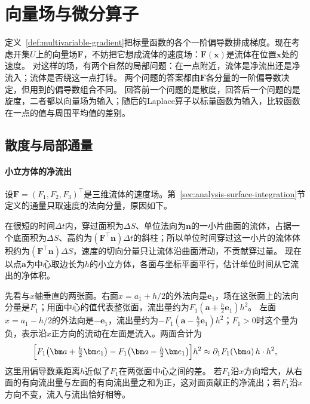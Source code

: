 \section{向量场与微分算子}

定义~\ref{def:multivariable-gradient}把标量函数的各个一阶偏导数排成梯度。现在考虑开集$U$上的向量场$\bm F$，不妨把它想成流体的速度场：$\bm F(\bm x)$是流体在位置$\bm x$处的速度。
对这样的场，有两个自然的局部问题：在一点附近，流体是净流出还是净流入；流体是否绕这一点打转。
两个问题的答案都由$\bm F$各分量的一阶偏导数决定，但用到的偏导数组合不同。
回答前一个问题的是散度，回答后一个问题的是旋度，二者都以向量场为输入；随后的Laplace算子以标量函数为输入，比较函数在一点的值与周围平均值的差别。

\subsection{散度与局部通量}

\paragraph{小立方体的净流出}

设$\bm F=(F_1,F_2,F_3)^\top$是三维流体的速度场。第~\ref{sec:analysis-surface-integration}节定义的通量只取速度的法向分量，原因如下。

在很短的时间$\Delta t$内，穿过面积为$\Delta S$、单位法向为$\bm n$的一小片曲面的流体，占据一个底面积为$\Delta S$、高约为$(\bm F^\top\bm n)\Delta t$的斜柱；所以单位时间穿过这一小片的流体体积约为$(\bm F^\top\bm n)\Delta S$，速度的切向分量只让流体沿曲面滑动，不贡献穿过量。
现在以点$\bm a$为中心取边长为$h$的小立方体，各面与坐标平面平行，估计单位时间从它流出的净体积。

先看与$x$轴垂直的两张面。右面$x=a_1+h/2$的外法向是$\bm e_1$，场在这张面上的法向分量是$F_1$；用面中心的值代表整张面，流出量约为$F_1(\bm a+\tfrac h2\bm e_1)h^2$。
左面$x=a_1-h/2$的外法向是$-\bm e_1$，流出量约为$-F_1(\bm a-\tfrac h2\bm e_1)h^2$；$F_1>0$时这个量为负，表示沿$x$正方向的流动在左面是流入。两面合计为
\[
 \Bigl[F_1\bigl(\bm a+\tfrac h2\bm e_1\bigr)-F_1\bigl(\bm a-\tfrac h2\bm e_1\bigr)\Bigr]h^2
 \approx \partial_1F_1(\bm a)\,h\cdot h^2,
\]
这里用偏导数乘距离$h$近似了$F_1$在两张面中心之间的差。
若$F_1$沿$x$方向增大，从右面的有向流出量与左面的有向流出量之和为正，这对面贡献正的净流出；若$F_1$沿$x$方向不变，流入与流出恰好相等。

